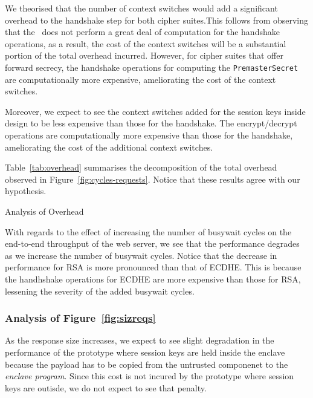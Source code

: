 \documentclass[../../../main.tex]{subfiles}
\begin{document}
We theorised that the number of context switches would add a
significant overhead to the handshake step for both cipher suites.This
follows from observing that the \enclaveprogram~does not perform a
great deal of computation for the handshake operations, as a result,
the cost of the context switches will be a substantial portion of the
total overhead incurred. However, for cipher suites that offer forward
secrecy, the handshake operations for computing the \texttt{PremasterSecret}
are computationally more expensive, ameliorating the cost of the context
switches.

Moreover, we expect to see the context switches added for the session
keys inside design to be less expensive than those for the handshake.
The encrypt/decrypt operations are computationally more expensive than
those for the handshake, ameliorating the cost of the additional
context switches.

Table~\ref{tab:overhead} summarises the decomposition of the total
overhead observed in Figure~\ref{fig:cycles-requests}. Notice that
these results agree with our hypothesis.

\begin{table}[H]
  \caption{Analysis of Overhead}
  \label{tab:overhead}
\end{table}

With regards to the effect of increasing the number of busywait cycles
on the end-to-end throughput of the web server, we see that the
performance degrades as we increase the number of busywait cycles.
Notice that the decrease in performance for RSA is more pronounced
than that of ECDHE. This is because the handhshake operations for
ECDHE are more expensive than those for RSA, lessening the severity of
the added busywait cycles.
\subsubsection*{Analysis of Figure~\ref{fig:sizreqs}}
As the response size increases, we expect to see slight degradation in
the performance of the prototype where session keys are held inside
the enclave because the payload has to be copied from the untrusted
componenet to the \textit{enclave program}. Since this cost is not
incured by the prototype where session keys are outisde, we do not
expect to see that penalty.
\end{document}
